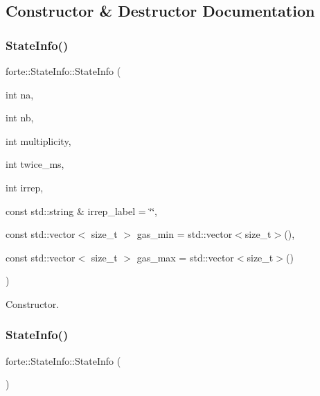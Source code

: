 \subsection{Constructor \& Destructor Documentation}
\mbox{\label{classforte_1_1_state_info_a7a372828466d8512e7a6a046b0f2c105}} 
\subsubsection{\texorpdfstring{State\+Info()}{StateInfo()}\hspace{0.1cm}{\footnotesize\ttfamily [1/2]}}
{\footnotesize\ttfamily forte\+::\+State\+Info\+::\+State\+Info (\begin{DoxyParamCaption}\item[{int}]{na,  }\item[{int}]{nb,  }\item[{int}]{multiplicity,  }\item[{int}]{twice\+\_\+ms,  }\item[{int}]{irrep,  }\item[{const std\+::string \&}]{irrep\+\_\+label = {\ttfamily \char`\"{}\char`\"{}},  }\item[{const std\+::vector$<$ size\+\_\+t $>$}]{gas\+\_\+min = {\ttfamily std\+:\+:vector$<$size\+\_\+t$>$()},  }\item[{const std\+::vector$<$ size\+\_\+t $>$}]{gas\+\_\+max = {\ttfamily std\+:\+:vector$<$size\+\_\+t$>$()} }\end{DoxyParamCaption})}



Constructor. 

\mbox{\label{classforte_1_1_state_info_aec2282c090c68fc2acfa2195d038ada4}} 
\subsubsection{\texorpdfstring{State\+Info()}{StateInfo()}\hspace{0.1cm}{\footnotesize\ttfamily [2/2]}}
{\footnotesize\ttfamily forte\+::\+State\+Info\+::\+State\+Info (\begin{DoxyParamCaption}{ }\end{DoxyParamCaption})\hspace{0.3cm}{\ttfamily [default]}}



